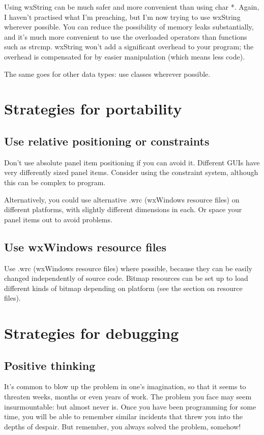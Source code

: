 Using wxString can be much safer and more convenient than using char *.
Again, I haven't practised what I'm preaching, but I'm now trying to use
wxString wherever possible. You can reduce the possibility of memory
leaks substantially, and it's much more convenient to use the overloaded
operators than functions such as strcmp. wxString won't add a significant
overhead to your program; the overhead is compensated for by easier
manipulation (which means less code).

The same goes for other data types: use classes wherever possible.

\section{Strategies for portability}

\subsection{Use relative positioning or constraints}

Don't use absolute panel item positioning if you can avoid it. Different GUIs have
very differently sized panel items. Consider using the constraint system, although this
can be complex to program.

Alternatively, you could use alternative .wrc (wxWindows resource files) on different
platforms, with slightly different dimensions in each. Or space your panel items out
to avoid problems.

\subsection{Use wxWindows resource files}

Use .wrc (wxWindows resource files) where possible, because they can be easily changed
independently of source code. Bitmap resources can be set up to load different
kinds of bitmap depending on platform (see the section on resource files).

\section{Strategies for debugging}\label{debugstrategies}

\subsection{Positive thinking}

It's common to blow up the problem in one's imagination, so that it seems to threaten
weeks, months or even years of work. The problem you face may seem insurmountable:
but almost never is. Once you have been programming for some time, you will be able
to remember similar incidents that threw you into the depths of despair. But
remember, you always solved the problem, somehow!

